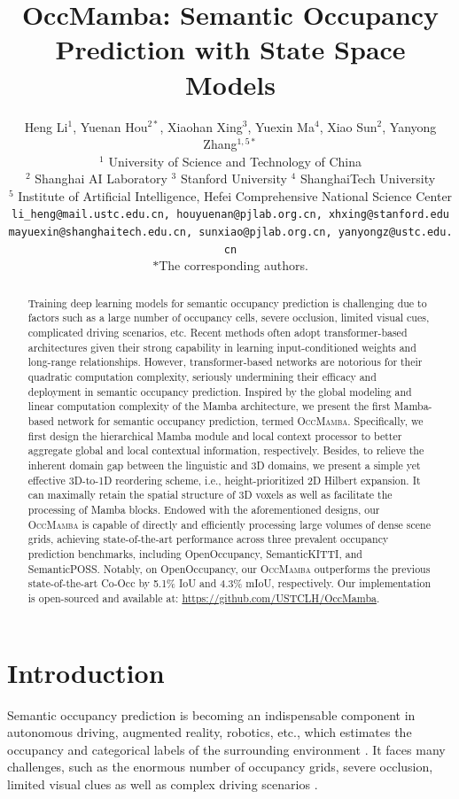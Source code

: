 \documentclass[10pt,twocolumn,letterpaper]{article}
\title{OccMamba: Semantic Occupancy Prediction with State Space Models}
\author{
  Heng Li$^{1}$,\quad
  Yuenan Hou$^{2*}$,\quad
  Xiaohan Xing$^{3}$,\quad
  Yuexin Ma$^{4}$,\quad
  Xiao Sun$^{2}$,\quad
  Yanyong Zhang$^{1,5*}$\\[4pt]
  $^{1}$ University of Science and Technology of China\\
  $^{2}$ Shanghai AI Laboratory\quad
  $^{3}$ Stanford University\quad
  $^{4}$ ShanghaiTech University\\
  $^{5}$ Institute of Artificial Intelligence, Hefei Comprehensive National Science Center\\[2pt]
  \texttt{li\_heng@mail.ustc.edu.cn,\ houyuenan@pjlab.org.cn,\ xhxing@stanford.edu}\\
  \texttt{mayuexin@shanghaitech.edu.cn,\ sunxiao@pjlab.org.cn,\ yanyongz@ustc.edu.cn}\\[2pt]
  \small{$*$The corresponding authors.}
}
\date{}
\newcommand{\methodname}{\textsc{OccMamba}}
\begin{document}
\maketitle

\begin{abstract}
Training deep learning models for semantic occupancy prediction is challenging due to factors such as a large number of occupancy cells, severe occlusion, limited visual cues, complicated driving scenarios, etc. Recent methods often adopt transformer-based architectures given their strong capability in learning input-conditioned weights and long-range relationships. However, transformer-based networks are notorious for their quadratic computation complexity, seriously undermining their efficacy and deployment in semantic occupancy prediction. Inspired by the global modeling and linear computation complexity of the Mamba architecture, we present the first Mamba-based network for semantic occupancy prediction, termed \methodname{}. Specifically, we first design the hierarchical Mamba module and local context processor to better aggregate global and local contextual information, respectively. Besides, to relieve the inherent domain gap between the linguistic and 3D domains, we present a simple yet effective 3D-to-1D reordering scheme, i.e., height-prioritized 2D Hilbert expansion. It can maximally retain the spatial structure of 3D voxels as well as facilitate the processing of Mamba blocks. Endowed with the aforementioned designs, our \methodname{} is capable of directly and efficiently processing large volumes of dense scene grids, achieving state-of-the-art performance across three prevalent occupancy prediction benchmarks, including OpenOccupancy, SemanticKITTI, and SemanticPOSS. Notably, on OpenOccupancy, our \methodname{} outperforms the previous state-of-the-art Co-Occ by 5.1\% IoU and 4.3\% mIoU, respectively. Our implementation is open-sourced and available at: \url{https://github.com/USTCLH/OccMamba}.
\end{abstract}


\section{Introduction}

Semantic occupancy prediction is becoming an indispensable component in autonomous driving, augmented reality, robotics, etc., which estimates the occupancy and categorical labels of the surrounding environment \cite{jingyipan2023}. It faces many challenges, such as the enormous number of occupancy grids, severe occlusion, limited visual clues as well as complex driving scenarios \cite{yananzhang2024}.
\end{document}
